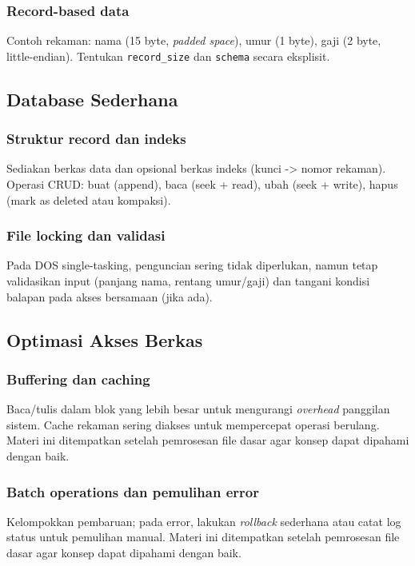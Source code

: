 \documentclass[../main.tex]{subfiles}
\begin{document}
            \subsubsection{Record-based data}
                Contoh rekaman: nama (15 byte, \textit{padded space}), umur (1 byte), gaji (2 byte, little-endian). Tentukan \texttt{record\_size} dan \texttt{schema} secara eksplisit.

        \subsection{Database Sederhana}
            \subsubsection{Struktur record dan indeks}
                Sediakan berkas data dan opsional berkas indeks (kunci -> nomor rekaman). Operasi CRUD: buat (append), baca (seek + read), ubah (seek + write), hapus (mark as deleted atau kompaksi).

            \subsubsection{File locking dan validasi}
                Pada DOS single-tasking, penguncian sering tidak diperlukan, namun tetap validasikan input (panjang nama, rentang umur/gaji) dan tangani kondisi balapan pada akses bersamaan (jika ada).

        \subsection{Optimasi Akses Berkas}
            \subsubsection{Buffering dan caching}
                Baca/tulis dalam blok yang lebih besar untuk mengurangi \textit{overhead} panggilan sistem. Cache rekaman sering diakses untuk mempercepat operasi berulang. Materi ini ditempatkan setelah pemrosesan file dasar agar konsep dapat dipahami dengan baik.

            \subsubsection{Batch operations dan pemulihan error}
                Kelompokkan pembaruan; pada error, lakukan \textit{rollback} sederhana atau catat log status untuk pemulihan manual. Materi ini ditempatkan setelah pemrosesan file dasar agar konsep dapat dipahami dengan baik.
\end{document}
